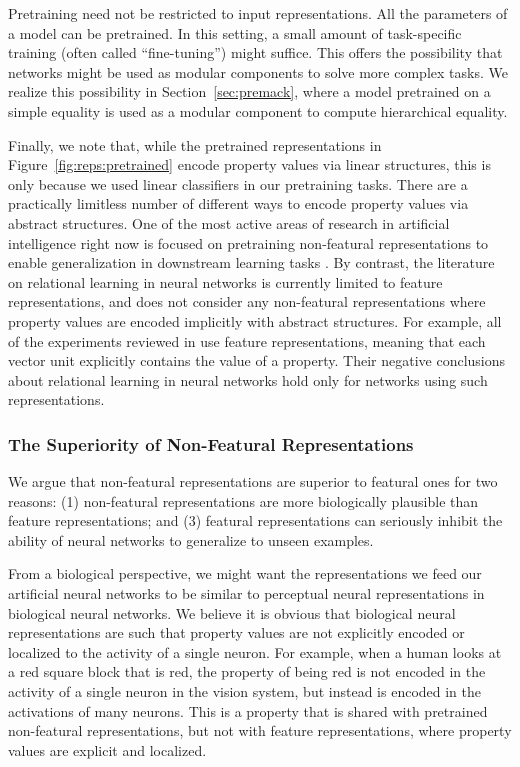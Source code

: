 \documentclass{article}
\newcommand{\secref}[1]{Section~\ref{#1}}
\newcommand{\figref}[1]{Figure~\ref{#1}}
\begin{document}
{Pretraining need not be restricted to input representations. All the parameters of a model can be pretrained. In this setting, a small amount of task-specific training (often called ``fine-tuning'') might suffice. This offers the possibility that networks might be used as modular components to solve more complex tasks. We realize this possibility in \secref{sec:premack}, where a model pretrained on a simple equality is used as a modular component to compute hierarchical equality.

Finally, we note that, while the pretrained representations in \figref{fig:reps:pretrained} encode property values via linear structures, this is only because we used linear classifiers in our pretraining tasks. There are a practically limitless number of different ways to encode property values via abstract structures. One of the most active areas of research in artificial intelligence right now is focused on pretraining non-featural representations to enable generalization in downstream learning tasks \cite{CollobertWeston:2011,Mikolov-etal:2013,pennington-socher-manning:2014:EMNLP2014,Peters-etal:2018,Devlin-etal:2019}. By contrast, the literature on relational learning in neural networks is currently limited to feature representations, and does not consider any non-featural representations where property values are encoded implicitly with abstract structures. For example, all of the experiments reviewed in \cite{alhama:2019} use feature representations, meaning that each vector unit explicitly contains the value of a property. Their negative conclusions about relational learning in neural networks hold only for networks using such representations.


\subsubsection{The Superiority of Non-Featural Representations}

We argue that non-featural representations are superior to featural ones for two reasons: (1) non-featural representations are more biologically plausible than feature representations; and (3) featural representations can seriously inhibit the ability of neural networks to generalize to unseen examples.

From a biological perspective, we might want the representations we feed our artificial neural networks to be similar to perceptual neural representations in biological neural networks. We believe it is obvious that biological neural representations are such that property values are not explicitly encoded or localized to the activity of a single neuron. For example, when a human looks at a red square block that is red, the property of being red is not encoded in the activity of a single neuron in the vision system, but instead is encoded in the activations of many neurons. This is a property that is shared with pretrained non-featural representations, but not with feature representations, where property values are explicit and localized.

}
\end{document}
